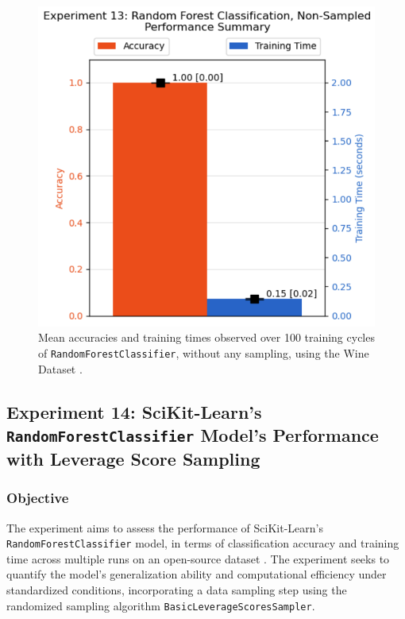 \documentclass{article}
\theoremstyle{plain}
\theoremstyle{definition}
\theoremstyle{remark}
\begin{document}
\begin{figure}[ht]
	\vskip 0.2in
	\begin{center}
		\centerline{\includegraphics[width=\columnwidth]{experiment_13}}
		\caption{Mean accuracies and training times observed over 100 training cycles of \texttt{RandomForestClassifier}, without any sampling, using the Wine Dataset \cite{wine}.}
		\label{experiment_13}
	\end{center}
	\vskip -0.2in
\end{figure}


\subsection{Experiment 14: SciKit-Learn's \texttt{RandomForestClassifier} Model's Performance with Leverage Score Sampling}

\subsubsection{Objective}

The experiment aims to assess the performance of SciKit-Learn's \texttt{RandomForestClassifier} model, in terms of classification accuracy and training time across multiple runs on an open-source dataset \cite{wine}. The experiment seeks to quantify the model's generalization ability and computational efficiency under standardized conditions, incorporating a data sampling step using the randomized sampling algorithm \texttt{BasicLeverageScoresSampler}.
\end{document}
